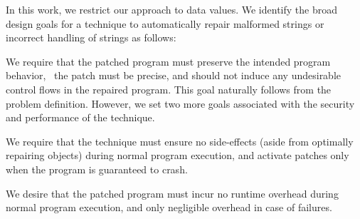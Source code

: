 
In this work, we restrict our approach to  data values. We identify
the broad design goals for a technique to automatically repair malformed strings or
incorrect handling of strings as follows:


 We require that the patched program must
preserve the intended program behavior, \ie\ the patch must be precise, and
should not induce any undesirable control flows in the repaired program. 
This goal naturally follows from the problem definition. However, we set two
more goals associated with the security and performance of the technique.

 We require that the technique
must ensure no side-effects (aside from optimally repairing objects) during
normal program execution, and activate patches only when the program is
guaranteed to crash.

 We desire that the patched program must
incur no runtime overhead during normal program execution, and only negligible
overhead in case of failures.

